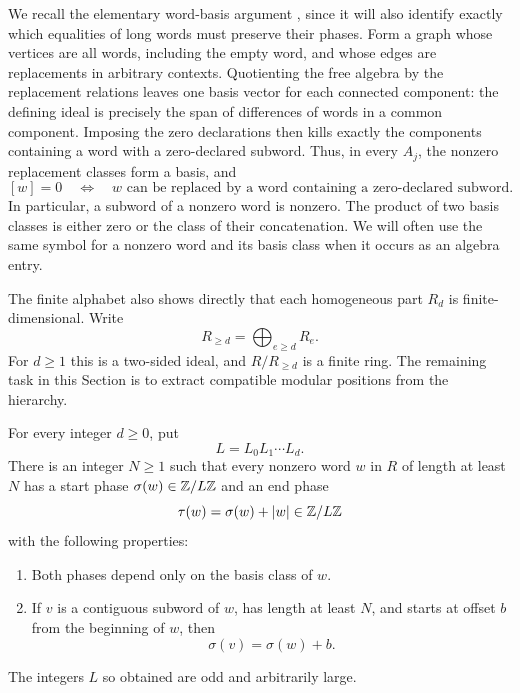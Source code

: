 We recall the elementary word-basis argument
\cite[Lemma~2.1]{Companion}, since it will also identify exactly which
equalities of long words must preserve their phases.  Form a graph
whose vertices are all words, including the empty word, and whose
edges are replacements in arbitrary contexts.  Quotienting the free
algebra by the replacement relations leaves one basis vector for each
connected component: the defining ideal is precisely the span of
differences of words in a common component.  Imposing the zero
declarations then kills exactly the components containing a word with
a zero-declared subword.  Thus, in every $A_j$, the nonzero replacement
classes form a basis, and
\begin{equation}\label{eq:word-zero-criterion}
 [w]=0\quad\Longleftrightarrow\quad
 \text{$w$ can be replaced by a word containing a zero-declared subword.}
\end{equation}
In particular, a subword of a nonzero word is nonzero.  The product of
two basis classes is either zero or the class of their concatenation.
We will often use the same symbol for a nonzero word and its basis
class when it occurs as an algebra entry.

The finite alphabet also shows directly that each homogeneous part
$R_d$ is finite-dimensional.  Write
\[
 R_{\geq d}=\bigoplus_{e\geq d}R_e.
\]
For $d\geq1$ this is a two-sided ideal, and $R/R_{\geq d}$ is a
finite ring.  The remaining task in this Section is to extract
compatible modular positions from the hierarchy.

\begin{lemma}\label{lem:phases}
For every integer $d\geq0$, put
\[
 L=L_0L_1\cdots L_d.
\]
There is an integer $N\geq1$ such that every nonzero word $w$ in $R$
of length at least $N$ has a start phase
$\sigma(w)\in\mathbb Z/L\mathbb Z$ and an end phase
\[
 \tau(w)=\sigma(w)+|w|\in\mathbb Z/L\mathbb Z
\]
with the following properties:
\begin{enumerate}[label=\textup{(\roman*)},leftmargin=*]
\item Both phases depend only on the basis class of $w$.
\item If $v$ is a contiguous subword of $w$, has length at least $N$,
and starts at offset $b$ from the beginning of $w$, then
\begin{equation}\label{eq:phase-subword}
 \sigma(v)=\sigma(w)+b.
\end{equation}
\end{enumerate}
The integers $L$ so obtained are odd and arbitrarily large.
\end{lemma}

